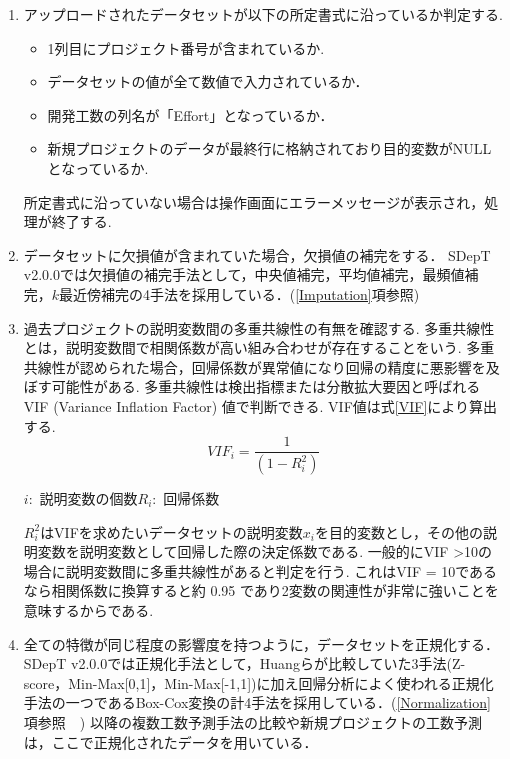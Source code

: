 \begin{enumerate}[label=前処理(\arabic*), leftmargin=6.0em]
  \item アップロードされたデータセットが以下の所定書式に沿っているか判定する.
  \begin{itemize}
    \item 1列目にプロジェクト番号が含まれているか.
    \item データセットの値が全て数値で入力されているか．
    \item 開発工数の列名が「Effort」となっているか．
    \item 新規プロジェクトのデータが最終行に格納されており目的変数がNULLとなっているか.
  \end{itemize}
  所定書式に沿っていない場合は操作画面にエラーメッセージが表示され，処理が終了する.
  \item データセットに欠損値が含まれていた場合，欠損値の補完をする．
  SDepT v2.0.0では欠損値の補完手法として，中央値補完，平均値補完，最頻値補完，$k$最近傍補完の4手法を採用している．(\ref{Imputation}項参照)
  \item 過去プロジェクトの説明変数間の多重共線性の有無を確認する.
  多重共線性とは，説明変数間で相関係数が高い組み合わせが存在することをいう.
  多重共線性が認められた場合，回帰係数が異常値になり回帰の精度に悪影響を及ぼす可能性がある.
  多重共線性は検出指標または分散拡大要因と呼ばれる VIF (Variance Inflation Factor) 値で判断できる.
  VIF値は式\ref{VIF}により算出する.
  \begin{equation}
    \label{VIF}
    VIF_{i}=  \frac{1}{(1 - R_{i}^{2} )}
  \end{equation}
  \begin{center}
  $i:$ 説明変数の個数$R_{i}:$ 回帰係数
  \end{center}
  $R_{i}^{2}$はVIFを求めたいデータセットの説明変数$x_{i}$を目的変数とし，その他の説明変数を説明変数として回帰した際の決定係数である.
  一般的にVIF \textgreater 10の場合に説明変数間に多重共線性があると判定を行う.
  これはVIF = 10であるなら相関係数に換算すると約 0.95 であり2変数の関連性が非常に強いことを意味するからである.
  \item 全ての特徴が同じ程度の影響度を持つように，データセットを正規化する．
  SDepT v2.0.0では正規化手法として，Huangら\cite{Huang2017}が比較していた3手法(Z-score，Min-Max[0,1]，Min-Max[-1,1])に加え回帰分析によく使われる正規化手法の一つであるBox-Cox変換の計4手法を採用している．(\ref{Normalization}項参照　)
  以降の複数工数予測手法の比較や新規プロジェクトの工数予測は，ここで正規化されたデータを用いている．
  
\end{enumerate}
